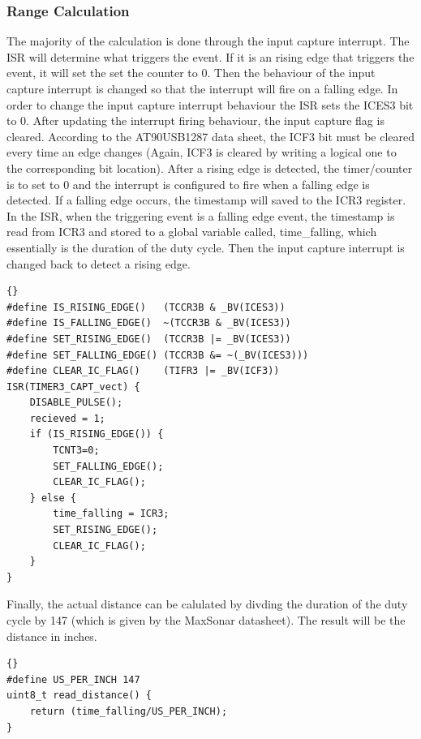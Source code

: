 \subsubsection{Range Calculation}
The majority of the calculation is done through the input capture interrupt. The ISR will determine what triggers the event. If it is an rising edge that triggers the event, it will set the set the counter to 0. Then the behaviour of the input capture interrupt is changed so that the interrupt will fire on a falling edge. In order to change the input capture interrupt behaviour the ISR sets the ICES3 bit to 0. After updating the interrupt firing behaviour, the input capture flag is cleared. According to the AT90USB1287 data sheet, the ICF3 bit must be cleared every time an edge changes (Again, ICF3 is cleared by writing a logical one to the corresponding bit location). After a rising edge is detected, the timer/counter is to set to 0 and the interrupt is configured to fire when a falling edge is detected. If a falling edge occurs, the timestamp will saved to the ICR3 register. In the ISR, when the triggering event is a falling edge event, the timestamp is read from ICR3 and stored to a global variable called, time\_falling, which essentially is the duration of the duty cycle. Then the input capture interrupt is changed back to detect a rising edge.

\lstset{language=c}
\lstset{commentstyle=\textit}
\begin{lstlisting}[frame=trbl]{}
#define IS_RISING_EDGE()   (TCCR3B & _BV(ICES3))
#define IS_FALLING_EDGE()  ~(TCCR3B & _BV(ICES3))
#define SET_RISING_EDGE()  (TCCR3B |= _BV(ICES3))                          
#define SET_FALLING_EDGE() (TCCR3B &= ~(_BV(ICES3)))                       
#define CLEAR_IC_FLAG()    (TIFR3 |= _BV(ICF3))
ISR(TIMER3_CAPT_vect) {
	DISABLE_PULSE();                                        
	recieved = 1;
	if (IS_RISING_EDGE()) {
		TCNT3=0;
		SET_FALLING_EDGE();
		CLEAR_IC_FLAG();
	} else {
		time_falling = ICR3;                    
		SET_RISING_EDGE();
		CLEAR_IC_FLAG();
	}	
}
\end{lstlisting}

Finally, the actual distance can be calulated by divding the duration of the duty cycle by 147 (which is given by the MaxSonar datasheet). The result will be the distance in inches.

\lstset{language=c}
\lstset{commentstyle=\textit}
\begin{lstlisting}[frame=trbl]{}
#define US_PER_INCH 147
uint8_t read_distance() {
	return (time_falling/US_PER_INCH);      
}
\end{lstlisting}


